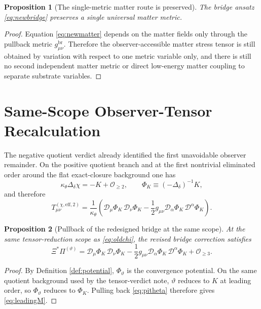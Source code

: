 \documentclass[11pt]{article}
\newcommand{\Dperp}{\mathcal D}
\newcommand{\PiTheta}{\Pi^{(\vartheta)}}
\newtheorem{proposition}{Proposition}
\begin{document}
\begin{proposition}[The single-metric matter route is preserved]
\label{prop:singlemetric}
The bridge ansatz \eqref{eq:newbridge} preserves a single universal matter metric.
\end{proposition}

\begin{proof}
Equation \eqref{eq:newmatter} depends on the matter fields only through the pullback metric \(g^{\mathrm{br}}_{\mu\nu}\). Therefore the observer-accessible matter stress tensor is still obtained by variation with respect to one metric variable only, and there is still no second independent matter metric or direct low-energy matter coupling to separate substrate variables.
\end{proof}

\section{Same-Scope Observer-Tensor Recalculation}

The negative quotient verdict already identified the first unavoidable observer remainder. On the positive quotient branch and at the first nontrivial eliminated order around the flat exact-closure background one has
\begin{equation}
\kappa_\theta \Delta_\delta \chi = -K + \mathcal O_{\ge 2},
\qquad
\Phi_K \equiv (-\Delta_\delta)^{-1}K,
\label{eq:chisolve}
\end{equation}
and therefore
\begin{equation}
T_{\mu\nu}^{(\chi,\mathrm{eff},2)}
=
\frac{1}{\kappa_\theta}
\left(
\Dperp_\mu\Phi_K\,\Dperp_\nu\Phi_K
-\frac12 g_{\mu\nu}\Dperp_\alpha\Phi_K\,\Dperp^\alpha\Phi_K
\right).
\label{eq:oldchi}
\end{equation}

\begin{proposition}[Pullback of the redesigned bridge at the same scope]
\label{prop:leading}
At the same tensor-reduction scope as \eqref{eq:oldchi}, the revised bridge correction satisfies
\begin{equation}
\Xi^\ast\PiTheta
=
\Dperp_\mu\Phi_K\,\Dperp_\nu\Phi_K
-\frac12 g_{\mu\nu}\Dperp_\alpha\Phi_K\,\Dperp^\alpha\Phi_K
+ \mathcal O_{\ge 3}.
\label{eq:leadingM}
\end{equation}
\end{proposition}

\begin{proof}
By Definition \ref{def:potential}, \(\Phi_\vartheta\) is the convergence potential. On the same quotient background used by the tensor-verdict note, \(\vartheta\) reduces to \(K\) at leading order, so \(\Phi_\vartheta\) reduces to \(\Phi_K\). Pulling back \eqref{eq:pitheta} therefore gives \eqref{eq:leadingM}.
\end{proof}
\end{document}
